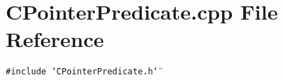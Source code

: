 \section{CPointer\-Predicate.cpp File Reference}
\label{CPointerPredicate_8cpp}
{\tt \#include \char`\"{}CPointer\-Predicate.h\char`\"{}}\par
